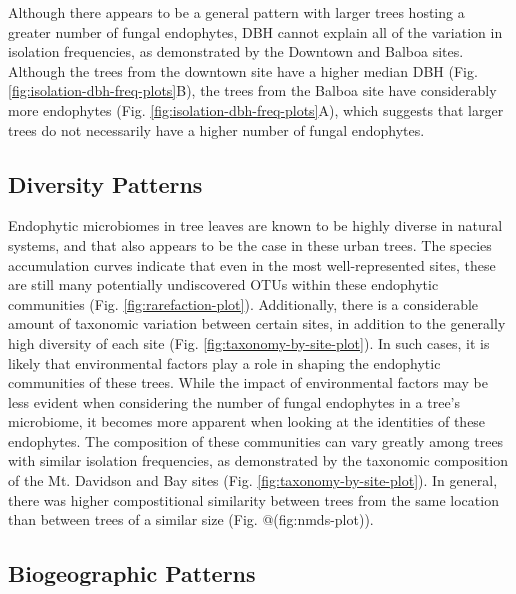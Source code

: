 \documentclass[fleqn,10pt,lineno]{wlpeerj} %
\begin{document}
Although there appears to be a general pattern with larger trees hosting a greater number of fungal endophytes, DBH cannot explain all of the variation in isolation frequencies, as demonstrated by the Downtown and Balboa sites. Although the trees from the downtown site have a higher median DBH (Fig. \ref{fig:isolation-dbh-freq-plots}B), the trees from the Balboa site have considerably more endophytes (Fig. \ref{fig:isolation-dbh-freq-plots}A), which suggests that larger trees do not necessarily have a higher number of fungal endophytes.

\hypertarget{diversity-patterns-1}{%
\subsection*{Diversity Patterns}\label{diversity-patterns-1}}

Endophytic microbiomes in tree leaves are known to be highly diverse in natural systems, and that also appears to be the case in these urban trees. The species accumulation curves indicate that even in the most well-represented sites, these are still many potentially undiscovered OTUs within these endophytic communities (Fig. \ref{fig:rarefaction-plot}). Additionally, there is a considerable amount of taxonomic variation between certain sites, in addition to the generally high diversity of each site (Fig. \ref{fig:taxonomy-by-site-plot}). In such cases, it is likely that environmental factors play a role in shaping the endophytic communities of these trees. While the impact of environmental factors may be less evident when considering the number of fungal endophytes in a tree's microbiome, it becomes more apparent when looking at the identities of these endophytes. The composition of these communities can vary greatly among trees with similar isolation frequencies, as demonstrated by the taxonomic composition of the Mt. Davidson and Bay sites (Fig. \ref{fig:taxonomy-by-site-plot}). In general, there was higher compostitional similarity between trees from the same location than between trees of a similar size (Fig. @(fig:nmds-plot)).

\hypertarget{biogeographic-patterns-1}{%
\subsection*{Biogeographic Patterns}\label{biogeographic-patterns-1}}
\end{document}
